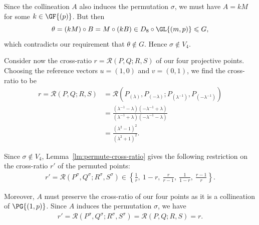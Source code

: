 Since the collineation $A$ also induces the permutation $\sigma$, we must have $A = kM$ for some $k \in \GF{\left(p \right)}$. But then
\begin{displaymath}
\theta = \left(kM \right) \circ B = M \circ \left(kB \right) \in D_8 \circ \GL{\left(m, p \right)} \leqslant G,
\end{displaymath}
which contradicts our requirement that $\theta \notin G$. Hence $\sigma \notin V_4$.

Consider now the cross-ratio $r = \mathcal{R}{\left(P, Q; R, S \right)}$ of our four projective points. Choosing the reference vectors $u = \left(1, 0 \right)$ and $v = \left(0, 1 \right)$, we find the cross-ratio to be
\begin{align*}
r = \mathcal{R}{\left(P, Q; R, S \right)} &= \mathcal{R}{\left(P_{\left(\lambda \right)}, P_{\left(-\lambda \right)}; P_{\left(\lambda^{-1} \right)}, P_{\left(-\lambda^{-1} \right)}\right)} \\
&= \frac{\left(\lambda^{-1} - \lambda \right) \left(-\lambda^{-1} + \lambda \right)}{\left(\lambda^{-1} + \lambda \right) \left(-\lambda^{-1} - \lambda \right)} \\
&= \frac{\left(\lambda^2 - 1 \right)^2}{\left(\lambda^2 + 1 \right)^2}.
\end{align*}

Since $\sigma \notin V_4$, Lemma~\ref{lm:permute-cross-ratio} gives the following restriction on the cross-ratio $r'$ of the permuted points:
\begin{align} \label{eqn:cross-ratio-possibilities}
r' = \mathcal{R}{\left(P^\sigma, Q^\sigma; R^\sigma, S^\sigma \right)} \in {\left\{\frac{1}{r},\ 1-r,\ \frac{r}{r-1},\ \frac{1}{1-r},\ \frac{r-1}{r} \right\}}.
\end{align}

Moreover, $A$ must preserve the cross-ratio of our four points as it is a collineation of $\PG{\left(1, p \right)}$. Since $A$ induces the permutation $\sigma$, we have
\begin{align} \label{eqn:cross-ratio-preserved}
r' = \mathcal{R}{\left(P^\sigma, Q^\sigma; R^\sigma, S^\sigma \right)} = \mathcal{R}{\left(P, Q; R, S \right)} = r.
\end{align}

